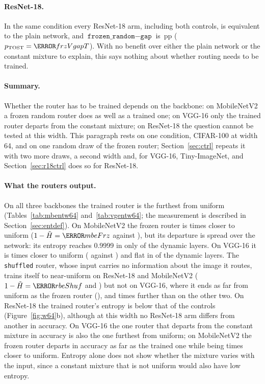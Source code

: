 \documentclass[10pt,a4paper]{article}
\begin{document}
\paragraph{ResNet-18.} In the same condition every ResNet-18 arm,
including both controls, is equivalent to the plain network, and
$\texttt{frozen\_random}-\texttt{gap}$ is \,pp
($p_{\text{TOST}}=\V{frzVgapT}$). With no benefit over either the plain
network or the constant mixture to explain, this says nothing about
whether routing needs to be trained.

\paragraph{Summary.} Whether the router has to be trained depends on the
backbone: on MobileNetV2 a frozen random router does as well as a trained
one; on VGG-16 only the trained router departs from the constant mixture;
on ResNet-18 the question cannot be tested at this width. This paragraph rests on one condition, CIFAR-100 at width 64, and on one
random draw of the frozen router; Section~\ref{sec:ctrl} repeats it with
two more draws, a second width and, for VGG-16, Tiny-ImageNet, and
Section~\ref{sec:r18ctrl} does so for ResNet-18.

\paragraph{What the routers output.} On all three backbones the trained
router is the furthest from uniform (Tables~\ref{tab:mbentw64}
and~\ref{tab:vgentw64}; the measurement is described in
Section~\ref{sec:entdef}). On MobileNetV2 the frozen router is
 times closer to uniform ($1-\tilde H=\V{mbeFrz}$ against
), but its departure is spread over the network: its entropy
reaches 0.9999 in only  of the  dynamic layers.
On VGG-16 it is  times closer to uniform ( against
) and flat in  of the  dynamic layers.
The \texttt{shuffled} router, whose input carries no information about the
image it routes, trains itself to near-uniform on ResNet-18 and MobileNetV2
($1-\tilde H=\V{rbeShuf}$ and ) but not on VGG-16, where it ends
as far from uniform as the frozen router (), 
and  times further than on the other two. On ResNet-18 the
trained router's entropy is below that of the controls
(Figure~\ref{fig:w64}b), although at this width no ResNet-18 arm differs
from another in accuracy. On VGG-16 the one router that departs from the
constant mixture in accuracy is also the one furthest from uniform; on
MobileNetV2 the frozen router departs in accuracy as far as the trained
one while being  times closer to uniform. Entropy alone does
not show whether the mixture varies with the input, since a constant
mixture that is not uniform would also have low entropy.
\end{document}
